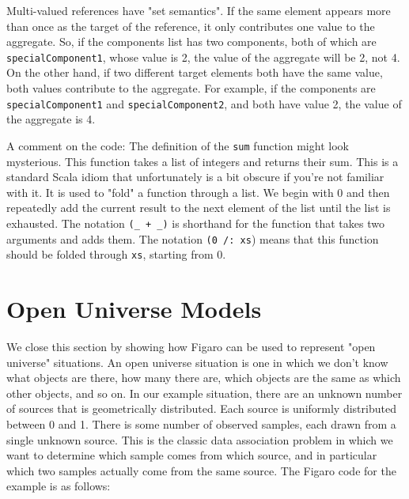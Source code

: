 Multi-valued references have "set semantics". If the same element appears more than once as the target of the reference, it only contributes one value to the aggregate. So, if the components list has two components, both of which are \texttt{specialComponent1}, whose value is 2, the value of the aggregate will be 2, not 4. On the other hand, if two different target elements both have the same value, both values contribute to the aggregate. For example, if the components are \texttt{specialComponent1} and \texttt{specialComponent2}, and both have value 2, the value of the aggregate is 4.

A comment on the code: The definition of the \texttt{sum} function might look mysterious. This function takes a list of integers and returns their sum. This is a standard Scala idiom that unfortunately is a bit obscure if you're not familiar with it. It is used to "fold" a function through a list. We begin with 0 and then repeatedly add the current result to the next element of the list until the list is exhausted. The notation \texttt{(\_ + \_)} is shorthand for the function that takes two arguments and adds them. The notation \texttt{(0 /: xs}) means that this function should be folded through \texttt{xs}, starting from 0.

\section{Open Universe Models}

We close this section by showing how Figaro can be used to represent "open universe" situations. An open universe situation is one in which we don't know what objects are there, how many there are, which objects are the same as which other objects, and so on. In our example situation, there are an unknown number of sources that is geometrically distributed. Each source is uniformly distributed between 0 and 1. There is some number of observed samples, each drawn from a single unknown source. This is the classic data association problem in which we want to determine which sample comes from which source, and in particular which two samples actually come from the same source. The Figaro code for the example is as follows:


